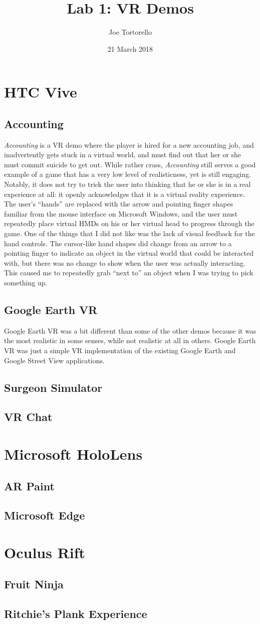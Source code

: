 \documentclass[11pt]{article}
\title{Lab 1: VR Demos}
\author{Joe Tortorello}
\date{21 March 2018}
\begin{document}
\maketitle
\section{HTC Vive}
\subsection{Accounting}
\textit{Accounting} is a VR demo where the player is hired for a new accounting job, and
inadvertently gets stuck in a virtual world, and must find out that her or she must commit
suicide to get out. While rather crass, \textit{Accounting} still serves a good example of
a game that has a very low level of realisticness, yet is still engaging. Notably, it does
not try to trick the user into thinking that he or she is in a real experience at all: it
openly acknowledges that it is a virtual reality experience. The user's ``hands'' are
replaced with the arrow and pointing finger shapes familiar from the mouse interface on
Microsoft Windows, and the user must repeatedly place virtual HMDs on his or her virtual
head to progress through the game. One of the things that I did not like was the lack of
visual feedback for the hand controls. The cursor-like hand shapes did change from an
arrow to a pointing finger to indicate an object in the virtual world that could be
interacted with, but there was no change to show when the user was actually interacting.
This caused me to repeatedly grab ``next to'' an object when I was trying to pick
something up.
\subsection{Google Earth VR}
Google Earth VR was a bit different than some of the other demos because it was the most
realistic in some senses, while not realistic at all in others. Google Earth VR was just a
simple VR implementation of the existing Google Earth and Google Street View applications.
\subsection{Surgeon Simulator}
\subsection{VR Chat}
\section{Microsoft HoloLens}
\subsection{AR Paint}
\subsection{Microsoft Edge}
\section{Oculus Rift}
\subsection{Fruit Ninja}
\subsection{Ritchie's Plank Experience}
\end{document}
